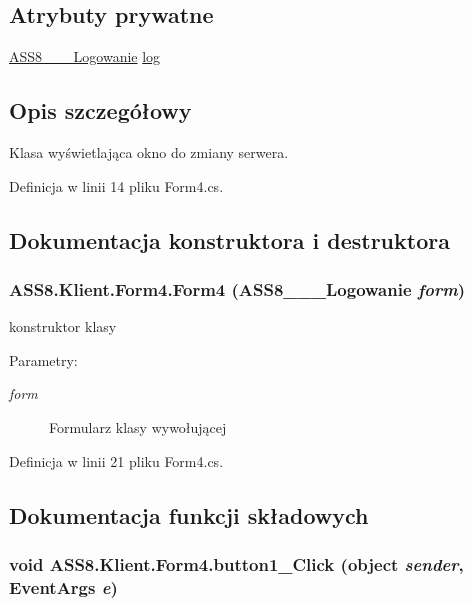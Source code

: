 \subsection*{Atrybuty prywatne}
\begin{CompactItemize}
\item 
\hyperlink{a00001}{ASS8\_\-\_\-\_\-Logowanie} \hyperlink{a00005_182469cf0d560d301c293d4961b44550}{log}
\end{CompactItemize}


\subsection{Opis szczegółowy}
Klasa wyświetlająca okno do zmiany serwera. 



Definicja w linii 14 pliku Form4.cs.

\subsection{Dokumentacja konstruktora i destruktora}
\hypertarget{a00005_c9962a9d1b3f147eefe50994127df5d7}{
\subsubsection[{Form4}]{\setlength{\rightskip}{0pt plus 5cm}ASS8.Klient.Form4.Form4 ({\bf ASS8\_\-\_\-\_\-Logowanie} {\em form})}}
\label{dd/dad/a00005_c9962a9d1b3f147eefe50994127df5d7}


konstruktor klasy 

\begin{Desc}
\item[Parametry:]
\begin{description}
\item[{\em form}]Formularz klasy wywołującej\end{description}
\end{Desc}


Definicja w linii 21 pliku Form4.cs.

\subsection{Dokumentacja funkcji składowych}
\hypertarget{a00005_6683aa1b2eba62015b3a0abf81058a9c}{
\subsubsection[{button1\_\-Click}]{\setlength{\rightskip}{0pt plus 5cm}void ASS8.Klient.Form4.button1\_\-Click (object {\em sender}, \/  EventArgs {\em e})}}
\label{dd/dad/a00005_6683aa1b2eba62015b3a0abf81058a9c}


